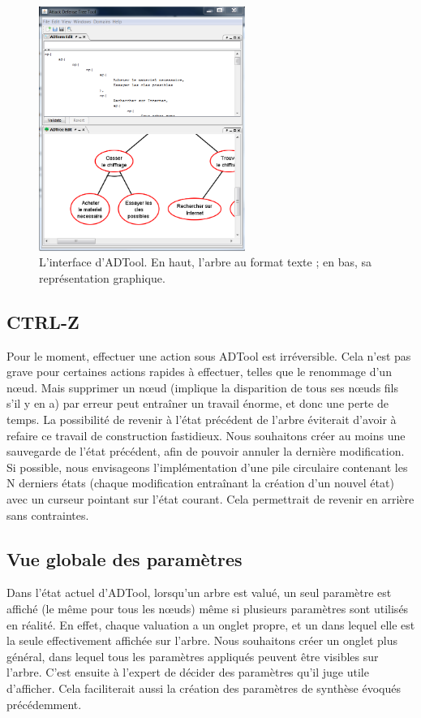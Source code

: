 		\begin{figure}[h]
			\centering
			\includegraphics[width=0.6\textwidth]{figure/interface_adtool.png}
			\caption{L'interface d'ADTool. En haut, l'arbre au format texte ; en bas, sa représentation graphique.}
			\label{fig:int_adTool}
		\end{figure}
	
	\subsection{CTRL-Z}	
		Pour le moment, effectuer une action sous ADTool est irréversible. Cela n'est pas grave pour certaines actions rapides à effectuer, telles que le renommage d'un nœud. Mais supprimer un nœud (implique la disparition de tous ses nœuds fils s'il y en a) par erreur peut entraîner un travail énorme, et donc une perte de temps. La possibilité de revenir à l'état précédent de l'arbre éviterait d'avoir à refaire ce travail de construction fastidieux. Nous souhaitons créer au moins une sauvegarde de l'état précédent, afin de pouvoir annuler la dernière modification. Si possible, nous envisageons l'implémentation d'une pile circulaire contenant les N derniers états (chaque modification entraînant la création d'un nouvel état) avec un curseur pointant sur l'état courant. Cela permettrait de revenir en arrière sans contraintes. %

	\subsection{Vue globale des paramètres}
		Dans l'état actuel d'ADTool, lorsqu'un arbre est valué, un seul paramètre est affiché (le même pour tous les nœuds) même si plusieurs paramètres sont utilisés en réalité. En effet, chaque valuation a un onglet propre, et un dans lequel elle est la seule effectivement affichée sur l'arbre.%
		 Nous souhaitons créer un onglet plus général, dans lequel tous les paramètres appliqués peuvent être visibles sur l'arbre. C'est ensuite à l'expert de décider des paramètres qu'il juge utile d'afficher. Cela faciliterait aussi la création des paramètres de synthèse évoqués précédemment.\\
	
